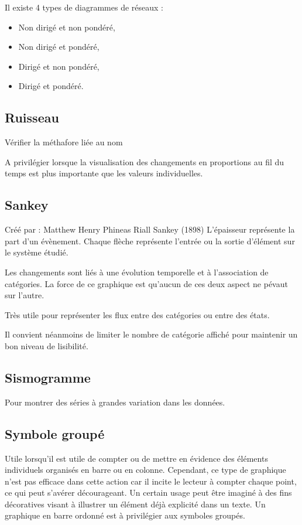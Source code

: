 \documentclass[a4paper,12pt]{article}
\begin{document}
\begin{multicols}{2}
Il existe 4 types de diagrammes de réseaux : \autocite{Schwabish2021p278}
\begin{itemize}
\item Non dirigé et non pondéré,
\item Non dirigé et pondéré,
\item Dirigé et non pondéré,
\item Dirigé et pondéré.
\end{itemize}
\subsection*{Ruisseau}
\label{sec:org0918b50}
Vérifier la méthafore liée au nom

A privilégier lorsque la visualisation des changements en proportions au fil du temps est plus importante que les valeurs individuelles. \autocite{alansmithLexiqueVisuel}
\subsection*{Sankey}
\label{sec:org7adaa04}
Créé par : Matthew Henry Phineas Riall Sankey (1898)
L'épaisseur représente la part d'un évènement. Chaque flèche représente l'entrée ou la sortie d'élément sur le système étudié. \autocite{mikeyiHowChooseRight2020}

Les changements sont liés à une évolution temporelle et à l'association de catégories. La force de ce graphique est qu'aucun de ces deux aspect ne pévaut sur l'autre. \autocite{jonathanschwabishComparingCategories2021}

Très utile pour représenter les flux entre des catégories ou entre des états. \autocite{jonathanschwabishComparingCategories2021}

Il convient néanmoins de limiter le nombre de catégorie  affiché pour maintenir un bon niveau de lisibilité. \autocite{jonathanschwabishComparingCategories2021}
\subsection*{Sismogramme}
\label{sec:orgdbb58a4}
Pour montrer des séries à grandes variation dans les données. \autocite{alansmithLexiqueVisuel}
\subsection*{Symbole groupé}
\label{sec:org61fb983}
Utile lorsqu'il est utile de compter ou de mettre en évidence des éléments individuels organisés en barre ou en colonne. \autocite{alansmithLexiqueVisuel} Cependant, ce type de graphique n'est pas efficace dans cette action car il incite le lecteur à compter chaque point, ce qui peut s'avérer décourageant. \autocite{stephenfewSillyGraphsThat2012} Un certain usage peut être imaginé à des fins décoratives visant à illustrer un élément déjà explicité dans un texte. Un graphique en barre ordonné est à privilégier aux symboles groupés.

\end{multicols}
\end{document}
